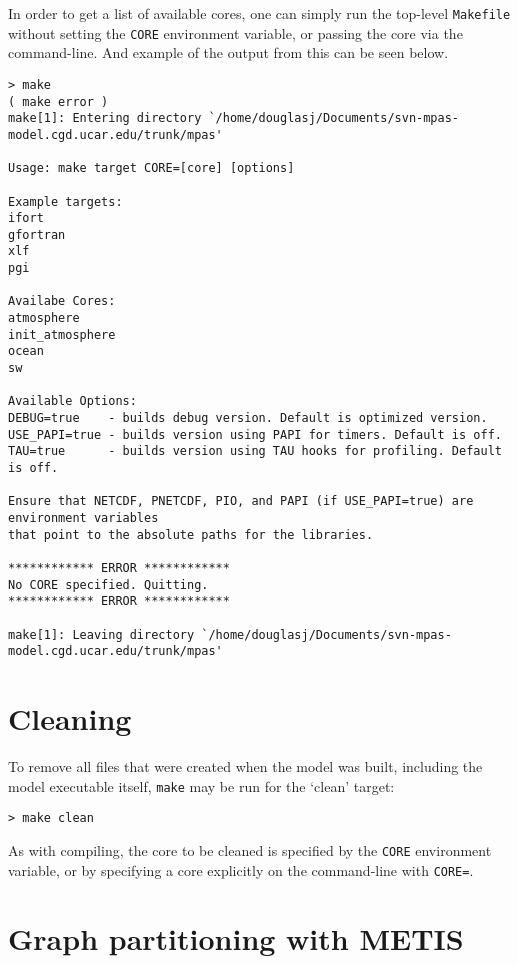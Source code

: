 In order to get a list of available cores, one can simply run the top-level {\tt Makefile} without setting the {\tt CORE} environment variable, or passing the core via the command-line. And example of the output from this can be seen below.

{\small
\begin{verbatim}
> make
( make error )
make[1]: Entering directory `/home/douglasj/Documents/svn-mpas-model.cgd.ucar.edu/trunk/mpas'

Usage: make target CORE=[core] [options]

Example targets:
ifort
gfortran
xlf
pgi

Availabe Cores:
atmosphere
init_atmosphere
ocean
sw

Available Options:
DEBUG=true    - builds debug version. Default is optimized version.
USE_PAPI=true - builds version using PAPI for timers. Default is off.
TAU=true      - builds version using TAU hooks for profiling. Default is off.

Ensure that NETCDF, PNETCDF, PIO, and PAPI (if USE_PAPI=true) are environment variables
that point to the absolute paths for the libraries.

************ ERROR ************
No CORE specified. Quitting.
************ ERROR ************

make[1]: Leaving directory `/home/douglasj/Documents/svn-mpas-model.cgd.ucar.edu/trunk/mpas'
\end{verbatim}
}

\section{Cleaning}

To remove all files  that were created when the model was built, including the model executable itself, {\tt make} may
be run for the `clean' target:

\vspace{12pt}
{\tt > make clean}
\vspace{12pt}

As with compiling, the core to be cleaned is specified by the {\tt CORE} environment variable, or by specifying a core explicitly on the command-line with {\tt CORE=}.


\section{Graph partitioning with METIS} 
\label{sec:metis}


